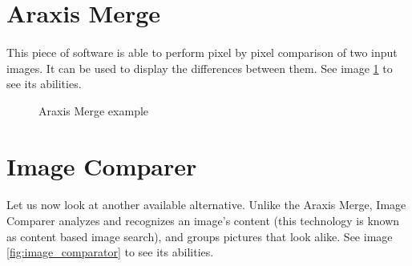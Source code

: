 \section{Araxis Merge}
\paragraph{}
This piece of software is able to perform pixel by pixel comparison of two input images. It can be used to display the differences between them. See image \ref{fig:araxis_input_output} to see its abilities.

\begin{figure}[H]
     \centering
     \qquad
     \caption{Araxis Merge example}
     \label{fig:araxis_input_output}
\end{figure}

\section{Image Comparer}
\paragraph{}
Let us now look at another available alternative. Unlike the Araxis Merge, Image Comparer analyzes and recognizes an image's content (this technology is known as content based image search), and groups pictures that look alike. See image \ref{fig:image_comparator} to see its abilities.


